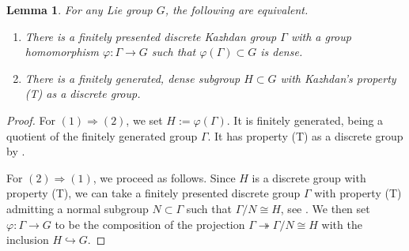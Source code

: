 \documentclass[11pt, letterpaper, oneside,reqno]{amsart}
\theoremstyle{plain}
\newtheorem{thm}{Theorem}[section]
\newtheorem{lemma}[thm]{Lemma}
\theoremstyle{underline}
\theoremstyle{definition}
\theoremstyle{remark}
\begin{document}
	
	\begin{lemma}\label{lem:aux}
		For any Lie group $G$, the following are equivalent.
		\begin{enumerate}
			\item There is a finitely presented discrete Kazhdan group $\Gamma$ with a group homomorphism $\varphi:\Gamma\rightarrow G$ such that $\varphi(\Gamma)\subset G$ is dense.
			\item There is a finitely generated, dense subgroup $H\subset G$ with Kazhdan's property (T) as a discrete group.
		\end{enumerate}
	\end{lemma}
	\begin{proof}
		For $(1)\Rightarrow (2)$, we set $H:=\varphi(\Gamma)$. It is finitely generated, being a quotient of the finitely generated group $\Gamma$. It has property (T) as a discrete group by \cite[Thm.~1.3.4]{Kazhdan}. 
		
		For $(2)\Rightarrow (1)$, we proceed as follows. Since $H$ is a discrete group with property (T), we can take a finitely presented discrete group $\Gamma$ with property (T) admitting a normal subgroup $N\subset \Gamma$ such that $\Gamma/N\cong H$, see \cite[Thm.~3.4.5]{Kazhdan}. We then set $\varphi:\Gamma\rightarrow G$ to be the composition of the projection
		$
		\Gamma\twoheadrightarrow\Gamma/N\cong H
		$
		with the inclusion $H\hookrightarrow G$.
	\end{proof}
	
	
	
\end{document}
